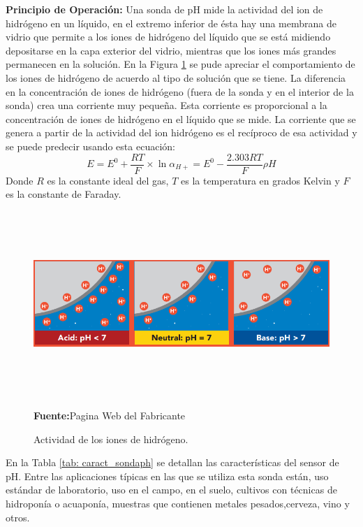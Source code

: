 \textbf{Principio de Operación: }Una sonda de pH mide la actividad del ion de hidrógeno en un líquido, en el extremo inferior de ésta hay una membrana de vidrio que permite a los iones de hidrógeno del líquido que se está midiendo depositarse en la capa exterior del vidrio, mientras que los iones más grandes permanecen en la solución. En la Figura \ref{fig:4.11} se pude apreciar el comportamiento de los iones de hidrógeno de acuerdo al tipo de solución que se tiene. La diferencia en la concentración de iones de hidrógeno (fuera de la sonda y en el interior de la sonda) crea una corriente muy pequeña. Esta corriente es proporcional a la concentración de iones de hidrógeno en el líquido que se mide.
La corriente que se genera a partir de la actividad del ion hidrógeno es el recíproco de esa actividad y se puede predecir usando esta ecuación:
\begin{equation}
E=E^0 + \frac{RT}{F}\times \ln\alpha_{H+} = E^0 - \frac{2.303RT}{F}\rho H
\label{eq:iv}
\end{equation}
Donde $R$ es la constante ideal del gas, $T$ es la temperatura en grados Kelvin y $F$ es la constante de Faraday.
\newline
\hfill
\begin{figure}[ht]
\centering
	\includegraphics[width=140mm, height=70mm]{Imagenes/2021/imag22.png}%
	\caption[Actividad de los iones de hidrógeno]{Actividad de los iones de hidrógeno.  }{\textbf{Fuente:}Pagina Web del Fabricante \cite{atlasph}}
	\label{fig:4.11}
\end{figure}

En la Tabla \ref{tab: caract_sondaph} se detallan las características del sensor de pH.
\newline
\hfill
Entre las aplicaciones típicas en las que se utiliza esta sonda están, uso estándar de laboratorio, uso en el campo, en el suelo, cultivos con técnicas de hidropon\'ia o acuapon\'ia, muestras que contienen metales pesados,cerveza, vino y otros.

